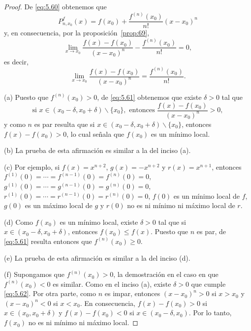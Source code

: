\documentclass[12pt,a4paper]{book}
\begin{document}
    \begin{proof}
        De \eqref{eq:5.60} obtenemos que
        \begin{equation*}
            P^{f}_{n,x_{0}}(x)=f(x_{0})+\frac{f^{(n)}(x_{0})}{n!}(x-x_{0})^{n}
        \end{equation*}
        y, en consecuencia, por la proposición~\ref{prop:69},
        \begin{equation*}
            \lim_{x\to x_{0}}\frac{f(x)-f(x_{0})}{(x-x_{0})^{n}}-\frac{f^{(n)}(x_{0})}{n!}=0,
        \end{equation*}
        es decir,
        \begin{equation}\label{eq:5.61}
            \lim_{x\to x_{0}}\frac{f(x)-f(x_{0})}{(x-x_{0})^{n}}=\frac{f^{(n)}(x_{0})}{n!}.
        \end{equation}

        (a) Puesto que $f^{(n)}(x_{0})>0$, de \eqref{eq:5.61} obtenemos que existe $\delta>0$ tal que
        \begin{equation}\label{eq:5.62}
            \text{si }x\in(x_{0}-\delta,x_{0}+\delta)\backslash\{x_{0}\},\text{ entonces }\frac{f(x)-f(x_{0})}{(x-x_{0})^{n}}>0,
        \end{equation}
        y como $n$ es par resulta que si $x\in(x_{0}-\delta,x_{0}+\delta)\backslash\{x_{0}\}$, entonces $f(x)-
        f(x_{0})>0$, lo cual señala que $f(x_{0})$ es un mínimo local.

        (b) La prueba de esta afirmación es similar a la del inciso (a).

        (c) Por ejemplo, si $f(x)=x^{n+2}$, $g(x)=-x^{n+2}$ y $r(x)=x^{n+1}$, entonces
        $f^{(1)}(0)=\cdots=f^{(n-1)}(0)=f^{(n)}(0)=0$, $g^{(1)}(0)=\cdots=g^{(n-1)}(0)=
        g^{(n)}(0)=0$, $r^{(1)}(0)=\cdots=r^{(n-1)}(0)=r^{(n)}(0)=0$, $f(0)$ es un mínimo
        local de $f$, $g(0)$ es un máximo local de $g$ y $r(0)$ no es ni mínimo ni máximo
        local de $r$.

        (d) Como $f(x_{0})$ es un mínimo local, existe $\delta>0$ tal que si $x\in
        (x_{0}-\delta,x_{0}+\delta)$, entonces $f(x_{0})\leq f(x)$. Puesto que $n$ es par, de \eqref{eq:5.61}
        resulta entonces que $f^{(n)}(x_{0})\geq 0$.

        (e) La prueba de esta afirmación es similar a la del inciso (d).

        (f) Supongamos que $f^{(n)}(x_{0})>0$, la demostración en el caso en que
        $f^{(n)}(x_{0})<0$ es similar. Como en el inciso (a), existe $\delta>0$ que cumple
        \eqref{eq:5.62}. Por otra parte, como $n$ es impar, entonces $(x-x_{0})^{n}>0$ si $x>x_{0}$ y
        $(x-x_{0})^{n}<0$ si $x<x_{0}$. En consecuencia, $f(x)-f(x_{0})>0$ si $x\in(x_{0},x_{0}+\delta)$
        y $f(x)-f(x_{0})<0$ si $x\in(x_{0}-\delta,x_{0})$. Por lo tanto, $f(x_{0})$ no es ni mínimo
        ni máximo local.


\end{proof}
\end{document}
